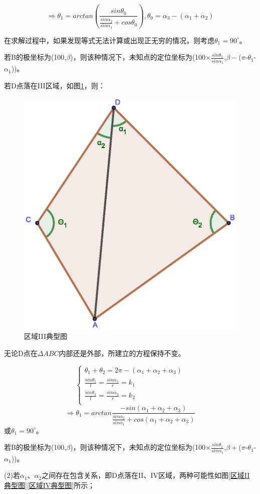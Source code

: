 \documentclass{ctexart}
\begin{document}
\[
    \Rightarrow \theta_1=arctan(\frac{sin\theta_0}{\frac{sin\alpha_2}{sin\alpha_1}+cos\theta_0}),\theta_0=\alpha_3-(\alpha_1+\alpha_2)
\]

在求解过程中，如果发现等式无法计算或出现正无穷的情况，则考虑$\theta_1=90^{\circ}$。

若B的极坐标为(100,$\beta$)，则该种情况下，未知点的定位坐标为(100$\times\frac{sin\theta_1}{sin\alpha_1}$,$\beta -$($\pi$-$\theta_1$-$\alpha_1$))。



若D点落在III区域，如图\ref{区域III典型图}，则：

\begin{figure}[H]
  \centering
  \includegraphics[width=0.35\linewidth]{pic/case3+.eps}
  \caption{区域III典型图}
  \label{区域III典型图}
  \end{figure} 


无论D点在$\Delta ABC$内部还是外部，所建立的方程保持不变。

\begin{equation}
    \left\{
              \begin{array}{ll}
                \theta_1+\theta_2=2\pi-(\alpha_1+\alpha_2+\alpha_3)\\
                \frac{sin\theta_1}{l}=\frac{sin\alpha_1}{r}=k_1\\
                \frac{sin\theta_2}{l}=\frac{sin\alpha_2}{r}=k_2\\

              \end{array}
            \right.
\end{equation}
\[
    \Rightarrow \theta_1=arctan \frac{-sin(\alpha_1+\alpha_2+\alpha_3)}{\frac{sin\alpha_2}{sin\alpha_1}+cos(\alpha_1+\alpha_2+\alpha_3)}
\]
或$\theta_1=90^{\circ}$。

若B的极坐标为(100,$\beta$)，则该种情况下，未知点的定位坐标为(100$\times\frac{sin\theta_1}{sin\alpha_1}$,$\beta +$($\pi$-$\theta_1$-$\alpha_1$))。


(2)若$\alpha_1$、$\alpha_2$之间存在包含关系，即D点落在II、IV区域，两种可能性如图\ref{区域II典型图}\ref{区域IV典型图}所示；
\end{document}

